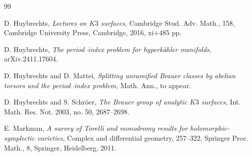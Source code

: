 \documentclass[11pt]{amsart}
\theoremstyle{plain}
\theoremstyle{definition}
\theoremstyle{remark}
\newcommand{\BP}{{\mathbb{P}}}
\begin{document}
\begin{thebibliography}{99}




 D. Huybrechts, {\em Lectures on $K3$ surfaces,} Cambridge Stud. Adv. Math., 158, Cambridge University Press, Cambridge, 2016, xi+485 pp.


 D. Huybrechts, {\em The period--index problem for hyperk\"ahler manifolds,} arXiv.2411.17604.


 D. Huybrechts and D. Mattei, {\em Splitting unramified Brauer classes by abelian torsors and the period--index problem,} Math. Ann., to appear.

 D. Huybrechts and S. Schr\"oer, {\em The Brauer group of analytic $K3$ surfaces,} Int. Math. Res. Not. 2003, no. 50, 2687--2698.




 E. Markman, {\em A survey of Torelli and monodromy results for holomorphic-symplectic varieties,} Complex and differential geometry, 257--322, Springer Proc. Math., 8, Springer, Heidelberg, 2011.



\end{thebibliography}
\end{document}
